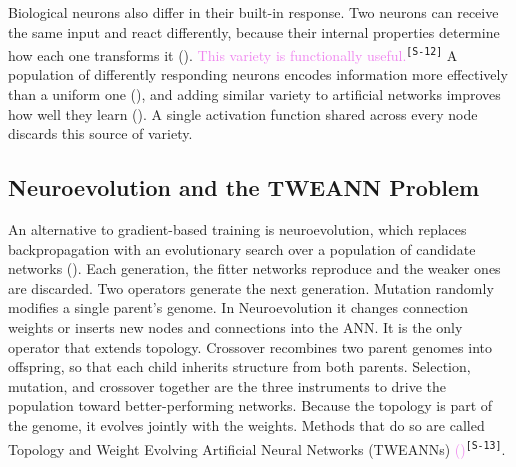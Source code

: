 \documentclass[12pt]{article}
\newcommand{\revID}[1]{\textsuperscript{\scriptsize\texttt{[#1]}}}
\newcommand{\revStyle}[2]{\textcolor{violet}{#2}\revID{#1}}   %
\begin{document}
Biological neurons also differ in their built-in response.
Two neurons can receive the same input and react differently, because their internal properties determine how each one transforms it (\cite{drion_ion_2015}).
\revStyle{S-12}{This variety is functionally useful.}
A population of differently responding neurons encodes information more effectively than a uniform one (\cite{tripathy_intermediate_2013}), and adding similar variety to artificial networks improves how well they learn (\cite{perez-nieves_neural_2021}).
A single activation function shared across every node discards this source of variety.



\subsection{Neuroevolution and the TWEANN Problem}
\label{subsec:neuroevolution}


An alternative to gradient-based training is neuroevolution, which replaces backpropagation with an evolutionary search over a population of candidate networks (\cite{stanley_designing_2019}).
Each generation, the fitter networks reproduce and the weaker ones are discarded.
Two operators generate the next generation.
Mutation randomly modifies a single parent's genome. In Neuroevolution it changes connection weights or inserts new nodes and connections into the ANN. It is the only operator that extends topology.
Crossover recombines two parent genomes into offspring, so that each child inherits structure from both parents.
Selection, mutation, and crossover together are the three instruments to drive the population toward better-performing networks.
Because the topology is part of the genome, it evolves jointly with the weights. Methods that do so are called Topology and Weight Evolving Artificial Neural Networks (TWEANNs) \revStyle{S-13}{(\cite{stanley_evolving_2002})}.
\end{document}
